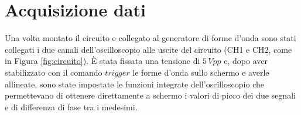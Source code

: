 \section{Acquisizione dati}
Una volta montato il circuito e collegato al generatore di forme d'onda sono stati collegati i due canali dell'oscilloscopio alle uscite del circuito (CH1 e CH2, come in Figura \ref{fig:circuito}). 
\`E stata fissata una tensione di $5\,Vpp$ e, dopo aver stabilizzato con il comando $trigger$ le forme d'onda sullo schermo e averle allineate, sono state impostate le funzioni integrate dell'oscilloscopio che permettevano di ottenere direttamente a schermo i valori di picco dei due segnali e di differenza di fase tra i medesimi.

